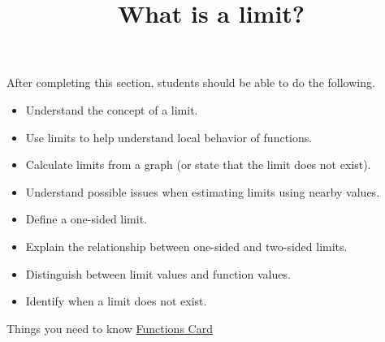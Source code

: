 \documentclass{ximera}
\title{What is a limit?}
\begin{document}
\begin{abstract}
\end{abstract}

\maketitle

\begin{sectionOutcomes}
After completing this section, students should be able to do the following.

\begin{itemize}
	\item Understand the concept of a limit.
    \item Use limits to help understand local behavior of functions.
	\item Calculate limits from a graph (or state that the limit does not exist).
	\item Understand possible issues when estimating limits using
          nearby values.
	\item Define a one-sided limit.
	\item Explain the relationship between one-sided and two-sided limits.
	\item Distinguish between limit values and function values.
	\item Identify when a limit does not exist.
\end{itemize}
\end{sectionOutcomes}

Things you need to know \href{/course/ColoradoStateMath/Math160/master/understandingFunctions/breakGround}{Functions Card}
\end{document}
